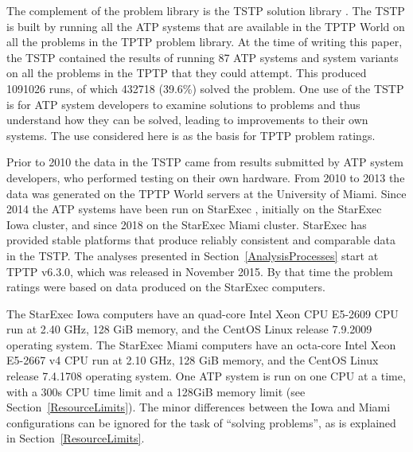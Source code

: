 \documentclass[runningheads]{llncs}
\begin{document}
The complement of the problem library is the TSTP solution library \cite{Sut07-CSR,Sut10}.
The TSTP is built by running all the ATP systems that are available in the TPTP World on
all the problems in the TPTP problem library.
At the time of writing this paper, the TSTP contained the results of running 87 ATP systems and 
system variants on all the problems in the TPTP that they could attempt.
This produced 1091026 runs, of which 432718 (39.6\%) solved the problem.
One use of the TSTP is for ATP system developers to examine solutions to problems and thus 
understand how they can be solved, leading to improvements to their own systems. 
The use considered here is as the basis for TPTP problem ratings.

Prior to 2010 the data in the TSTP came from results submitted by ATP system developers, who
performed testing on their own hardware.
From 2010 to 2013 the data was generated on the TPTP World servers at the University of Miami.
Since 2014 the ATP systems have been run on StarExec \cite{SST14}, initially on the StarExec
Iowa cluster, and since 2018 on the StarExec Miami cluster.
StarExec has provided stable platforms that produce reliably consistent and comparable data in
the TSTP.
The analyses presented in Section~\ref{AnalysisProcesses} start at TPTP v6.3.0, which was released 
in November 2015. 
By that time the problem ratings were 
based on data produced on the StarExec computers.

The StarExec Iowa computers have an 
quad-core Intel Xeon CPU E5-2609 CPU run at 2.40 GHz,
128 GiB memory,
and the CentOS Linux release 7.9.2009 operating system.
The StarExec Miami computers have an
octa-core Intel Xeon E5-2667 v4 CPU run at 2.10 GHz,
128 GiB memory,
and the CentOS Linux release 7.4.1708 operating system.
One ATP system is run on one CPU at a time, with a 300s CPU time limit and a 128GiB memory
limit (see Section~\ref{ResourceLimits}).
The minor differences between the Iowa and Miami configurations can be ignored for the task
of ``solving problems'', as is explained in Section~\ref{ResourceLimits}.
\end{document}

